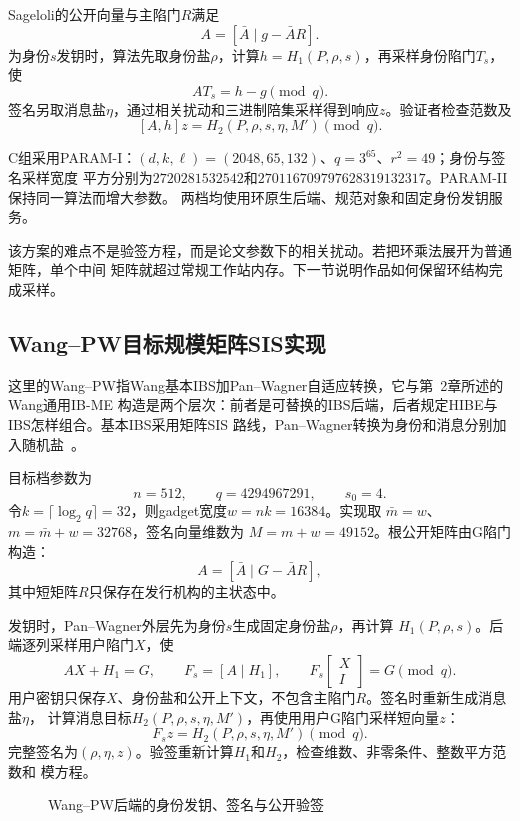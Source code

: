 Sageloli的公开向量与主陷门$R$满足~\cite{sageloli2023ibs}
\[
 A=[\bar A\mid g-\bar AR].
\]
为身份$s$发钥时，算法先取身份盐$\rho$，计算$h=H_1(P,\rho,s)$，再采样身份陷门$T_s$，使
\[
 AT_s=h-g\pmod q.
\]
签名另取消息盐$\eta$，通过相关扰动和三进制陪集采样得到响应$z$。验证者检查范数及
\[
 [A,h]z=H_2(P,\rho,s,\eta,M')\pmod q.
\]

C组采用PARAM-I：$(d,k,\ell)=(2048,65,132)$、$q=3^{65}$、$r^2=49$；身份与签名采样宽度
平方分别为$2720281532542$和$270116709797628319132317$。PARAM-II保持同一算法而增大参数。
两档均使用环原生后端、规范对象和固定身份发钥服务。

该方案的难点不是验签方程，而是论文参数下的相关扰动。若把环乘法展开为普通矩阵，单个中间
矩阵就超过常规工作站内存。下一节说明作品如何保留环结构完成采样。

\subsection{Wang--PW目标规模矩阵SIS实现}

这里的Wang--PW指Wang基本IBS加Pan--Wagner自适应转换，它与第~2章所述的Wang通用IB-ME
构造是两个层次：前者是可替换的IBS后端，后者规定HIBE与IBS怎样组合。基本IBS采用矩阵SIS
路线，Pan--Wagner转换为身份和消息分别加入随机盐~\cite{wang2024ibme,pan2021ibs}。

目标档参数为
\[
 n=512,\qquad q=4294967291,\qquad s_0=4.
\]
令$k=\lceil\log_2q\rceil=32$，则gadget宽度$w=nk=16384$。实现取
$\bar m=w$、$m=\bar m+w=32768$，签名向量维数为
$M=m+w=49152$。根公开矩阵由G陷门构造：
\[
 A=[\bar A\mid G-\bar AR],
\]
其中短矩阵$R$只保存在发行机构的主状态中。

发钥时，Pan--Wagner外层先为身份$s$生成固定身份盐$\rho$，再计算
$H_1(P,\rho,s)$。后端逐列采样用户陷门$X$，使
\[
 AX+H_1=G,
 \qquad
 F_s=[A\mid H_1],
 \qquad
 F_s\begin{bmatrix}X\\I\end{bmatrix}=G\pmod q.
\]
用户密钥只保存$X$、身份盐和公开上下文，不包含主陷门$R$。签名时重新生成消息盐$\eta$，
计算消息目标$H_2(P,\rho,s,\eta,M')$，再使用用户G陷门采样短向量$z$：
\[
 F_s z=H_2(P,\rho,s,\eta,M')\pmod q.
\]
完整签名为$(\rho,\eta,z)$。验签重新计算$H_1$和$H_2$，检查维数、非零条件、整数平方范数和
模方程。

\begin{figure}[H]
\centering
{}
\caption{Wang--PW后端的身份发钥、签名与公开验签}
\label{fig:wang-pw-flow}
\end{figure}

